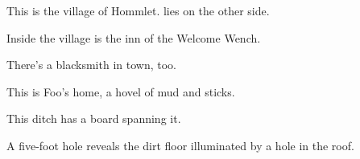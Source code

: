 \documentclass[letterpaper,10pt,twoside,twocolumn,openany]{dndbook}
\begin{document}
\DndSetAreaOptions[region=H]
This is the village of Hommlet.  lies on the other side.

Inside the village is the inn of the Welcome Wench.

There's a blacksmith in town, too.

\DndSetAreaOptions[region=F]
This is Foo's home, a hovel of mud and sticks.

This ditch has a board spanning it.

A five-foot hole reveals the dirt floor illuminated by a hole in the roof.
\end{document}

